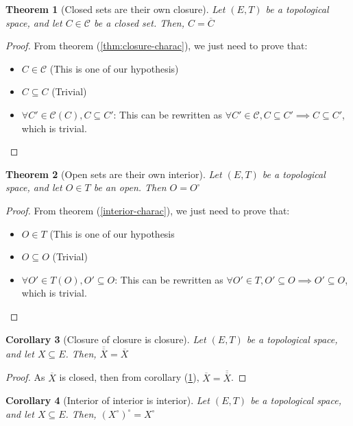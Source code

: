 \documentclass{article}
\newtheorem{theorem}{Theorem}[section]
\newtheorem{corollary}[theorem]{Corollary}
\theoremstyle{definition}
\theoremstyle{remark}
\theoremstyle{example}
\theoremstyle{notation}
\newcommand{\inter}[1]{{{#1}^\circ}}
\newcommand{\closed}{\mathcal{C}}
\begin{document}
\begin{theorem}[Closed sets are their own closure] \label{thm:closed-eq-closure}
		Let $(E, T)$ be a topological space, and let $C \in \closed$ be a closed set. Then, $C = \overline{C}$
\end{theorem}

\begin{proof}
		From theorem (\ref{thm:closure-charac}), we just need to prove that:
		\begin{itemize}
				\item $C \in \closed$ (This is one of our hypothesis)
				\item $C \subseteq C$ (Trivial)
				\item $\forall C' \in \closed(C), C \subseteq C'$: This can be rewritten as $\forall C' \in \closed, C \subseteq C' \implies C \subseteq C'$, which is trivial.
		\end{itemize}
\end{proof}

\begin{theorem}[Open sets are their own interior] \label{thm:open-eq-interior}
		Let $(E, T)$ be a topological space, and let $O \in T$ be an open. Then $O = \inter{O}$
\end{theorem}

\begin{proof}
		From theorem (\ref{interior-charac}), we just need to prove that:
		\begin{itemize}
				\item $O \in T$ (This is one of our hypothesis
				\item $O \subseteq O$ (Trivial)
				\item $\forall O' \in T(O), O' \subseteq O$: This can be rewritten as $\forall O' \in T, O' \subseteq O \implies O' \subseteq O$, which is trivial.
		\end{itemize}
\end{proof}

\begin{corollary}[Closure of closure is closure]
		Let $(E, T)$ be a topological space, and let $X \subseteq E$. Then, $\overline{\overline{X}} = \overline{X}$ 
\end{corollary}

\begin{proof}
		As $\overline{X}$ is closed, then from corollary (\ref{thm:closed-eq-closure}), $\overline{X} = \overline{\overline{X}}$.
\end{proof}

\begin{corollary}[Interior of interior is interior]
		Let $(E, T)$ be a topological space, and let $X \subseteq E$. Then, $\inter{(\inter{X})} = \inter{X}$
\end{corollary}
\end{document}
